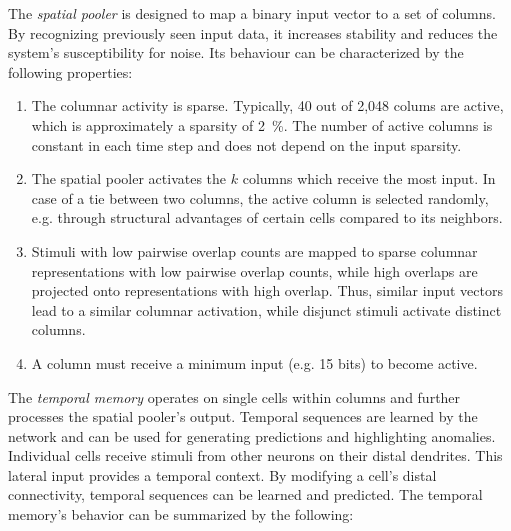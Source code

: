 \label{sec:spatial_pooler_properties}

The \emph{spatial pooler} is designed to map a binary input vector to a set of
columns. By recognizing previously seen input data, it increases stability and
reduces the system's susceptibility for noise. Its behaviour can be
characterized by the following properties:

\begin{enumerate}
	\item\label{enm:spatial_pooler_sparsity} The columnar activity is sparse.
	Typically, 40 out of 2,048 colums are active, which is approximately a
	sparsity
	of \SI{2}{\%}. The number of active columns is constant in each time step and
	does not depend on the input sparsity.

	\item\label{enm:spatial_pooler_selection} The spatial pooler activates the $k$
	columns which receive the most input. In case of a tie between two columns, the
	active column is selected randomly, e.g. through structural advantages of
	certain cells compared to its neighbors.

	\item\label{enm:spatial_pooler_overlap} Stimuli with low pairwise overlap
	counts are mapped to sparse columnar representations with low pairwise
	overlap counts, while high overlaps are projected onto representations
	with high overlap. Thus, similar input vectors lead to a similar columnar
	activation, while disjunct stimuli activate distinct columns.

	\item\label{enm:spatial_pooler_minimum} A column must receive a minimum input
	(e.g. 15 bits) to become active.

\end{enumerate}


The \emph{temporal memory} operates on single cells within columns and further
processes the spatial pooler's output. Temporal sequences are learned by the
network and can be used for generating predictions and highlighting anomalies.
Individual cells receive stimuli from other neurons on their distal dendrites.
This lateral input provides a temporal context. By modifying a cell's distal
connectivity, temporal sequences can be learned and predicted. The temporal
memory's behavior can be summarized by the following:

